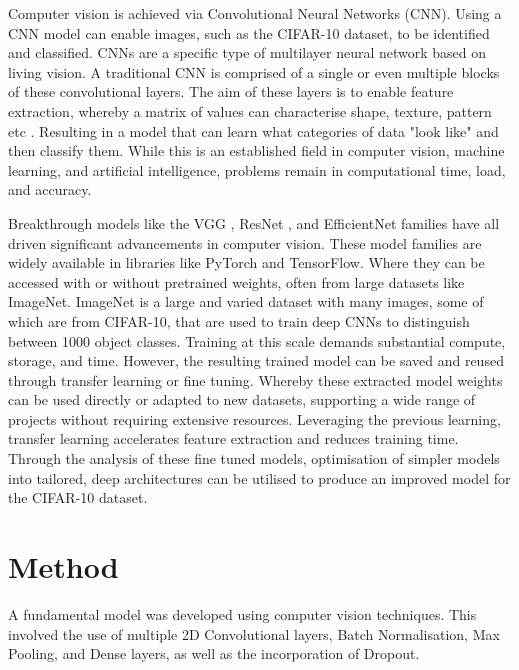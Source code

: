\documentclass[10pt,twocolumn,letterpaper]{article}
\begin{document}
Computer vision is achieved via Convolutional Neural Networks (CNN). Using a CNN model can enable images, such as the CIFAR-10 dataset, to be identified and classified. CNNs are a specific type of multilayer neural network based on living vision. A traditional CNN is comprised of a single or even multiple blocks of these convolutional layers. The aim of these layers is to enable feature extraction, whereby a matrix of values can characterise shape, texture, pattern etc \cite{recent_trends}. Resulting in a model that can learn what categories of data "look like" and then classify them. While this is an established field in computer vision, machine learning, and artificial intelligence, problems remain in computational time, load, and accuracy. 

Breakthrough models like the VGG \cite{original_vgg}, ResNet \cite{original_resnet}, and EfficientNet \cite{original_efficientnet} families have all driven significant advancements in computer vision. These model families are widely available in libraries like PyTorch and TensorFlow. Where they can be accessed with or without pretrained weights, often from large datasets like ImageNet. ImageNet is a large and varied dataset with many images, some of which are from CIFAR-10, that are used to train deep CNNs to distinguish between 1000 object classes. Training at this scale demands substantial compute, storage, and time. However, the resulting trained model can be saved and reused through transfer learning or fine tuning. Whereby these extracted model weights can be used directly or adapted to new datasets, supporting a wide range of projects without requiring extensive resources. Leveraging the previous learning, transfer learning accelerates feature extraction and reduces training time. Through the analysis of these fine tuned models, optimisation of simpler models into tailored, deep architectures can be utilised to produce an improved model for the CIFAR-10 dataset.


\section{Method}
\label{sec:method}
A fundamental model was developed using computer vision techniques. This involved the use of multiple 2D Convolutional layers, Batch Normalisation, Max Pooling, and Dense layers, as well as the incorporation of Dropout.
\end{document}
